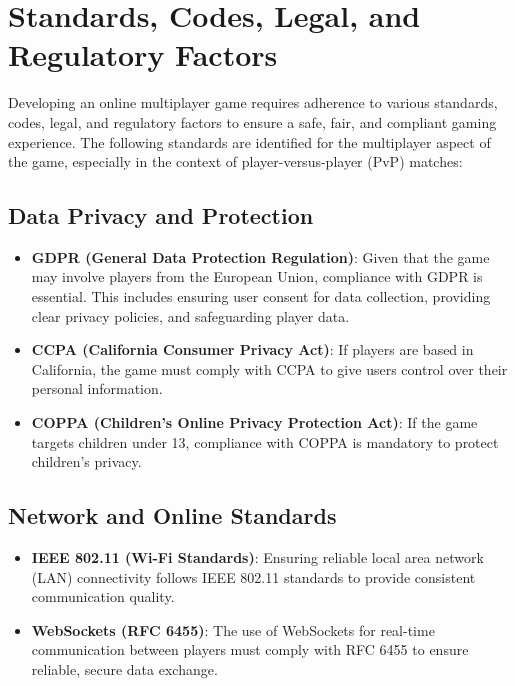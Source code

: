 \section{Standards, Codes, Legal, and Regulatory Factors}    

Developing an online multiplayer game requires adherence to various standards, codes, legal, and regulatory factors to ensure a safe, fair, and compliant gaming experience. The following standards are identified for the multiplayer aspect of the game, especially in the context of player-versus-player (PvP) matches:

\subsection{Data Privacy and Protection}
\begin{itemize}
    \item \textbf{GDPR (General Data Protection Regulation)}: Given that the game may involve players from the European Union, compliance with GDPR is essential. This includes ensuring user consent for data collection, providing clear privacy policies, and safeguarding player data.
    \item \textbf{CCPA (California Consumer Privacy Act)}: If players are based in California, the game must comply with CCPA to give users control over their personal information.
    \item \textbf{COPPA (Children's Online Privacy Protection Act)}: If the game targets children under 13, compliance with COPPA is mandatory to protect children’s privacy.
\end{itemize}

\subsection{Network and Online Standards}
\begin{itemize}
    \item \textbf{IEEE 802.11 (Wi-Fi Standards)}: Ensuring reliable local area network (LAN) connectivity follows IEEE 802.11 standards to provide consistent communication quality.
    \item \textbf{WebSockets (RFC 6455)}: The use of WebSockets for real-time communication between players must comply with RFC 6455 to ensure reliable, secure data exchange.
\end{itemize}

